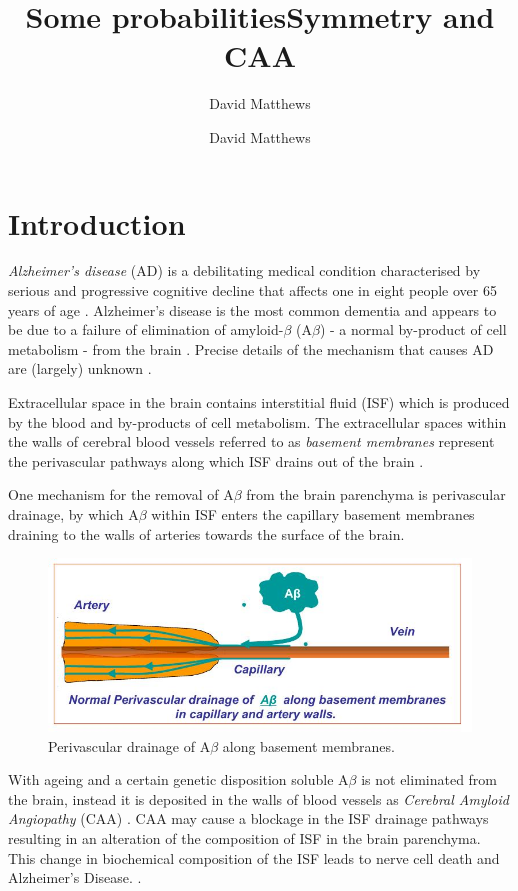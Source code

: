 \documentclass[10pt]{amsart} %
\title{Some probabilities}
\author{David Matthews}
\theoremstyle{definition}
\begin{document}
\title{Symmetry and CAA}
\author{David Matthews}

\section{Introduction}\label{sec:intro}
\emph{Alzheimer's disease} (AD) is a debilitating medical condition characterised by serious and progressive cognitive decline that affects one in eight people over 65 years of age \cite{Bengt}. Alzheimer's disease is the most common dementia and appears to be due to a failure of elimination of amyloid-$\beta$ (A$\beta$) - a normal by-product of cell metabolism 
- from the brain \cite{wellermicro}. Precise details of the mechanism that causes AD are (largely) unknown  \cite{wellerperi}. 

Extracellular space in the brain contains interstitial fluid (ISF) which is produced by the blood and by-products of cell metabolism.  The extracellular spaces within the walls of cerebral blood vessels referred to as \emph{basement membranes} represent the perivascular pathways along which ISF drains out of the brain \cite{wellerperi,wellermicro,Rox}.  

One mechanism for the removal of A$\beta$ from the brain parenchyma is perivascular drainage, by which A$\beta$ within ISF enters the capillary basement membranes draining to the walls of arteries towards the surface of the brain. 

\begin{figure}[h]

              \centering
               \includegraphics[scale=0.6]{drainage.jpg}
                \caption{Perivascular drainage of A$\beta$ along basement membranes.}\label{fig:1}
\end{figure}

With ageing and a certain genetic disposition soluble A$\beta$ is not eliminated from the brain, instead it is deposited in the walls of blood vessels as \emph{Cerebral Amyloid Angiopathy} (CAA) \cite{Rox,;wellerperi}. CAA may cause a blockage in the ISF drainage pathways resulting in an alteration of the composition of ISF in the brain parenchyma. This change in biochemical composition of the ISF leads to nerve cell death and Alzheimer's Disease. \cite{Rox}.   
\end{document}
